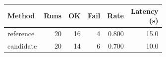\begin{tabular}{lrrrrr}
\hline
Method & Runs & OK & Fail & Rate & \shortstack{Latency\\(s)} \\
\hline
reference & 20 & 16 & 4 & 0.800 & 15.0 \\
candidate & 20 & 14 & 6 & 0.700 & 10.0 \\
\hline
\end{tabular}
